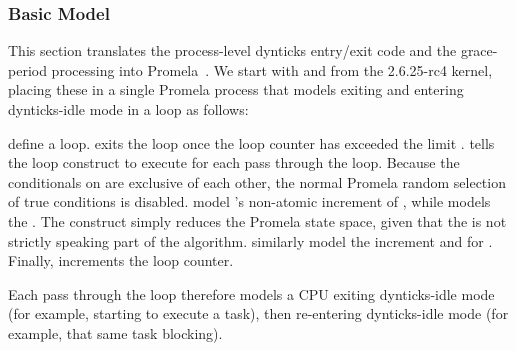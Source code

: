 \subsubsection{Basic Model}
\label{sec:formal:Basic Model}

This section translates the process-level dynticks entry/exit
code and the grace-period processing into
Promela~\cite{Holzmann03a}.
We start with  and
from the 2.6.25-rc4 kernel, placing these in a single Promela
process that models exiting and entering dynticks-idle mode in
a loop as follows:



\begin{fcvref}
 define a loop.
 exits the loop once the loop counter 
has exceeded the limit .
 tells the loop construct to execute
for each pass through the loop.
Because the conditionals on 
are exclusive of
each other, the normal Promela random selection of true conditions
is disabled.
 model
's non-atomic
increment of , while
 models the .
The  construct simply reduces the Promela state space,
given that the  is not strictly speaking part
of the algorithm.
 similarly model the increment and
 for .
Finally,  increments the loop counter.
\end{fcvref}

Each pass through the loop therefore models a CPU exiting
dynticks-idle mode (for example, starting to execute a task), then
re-entering dynticks-idle mode (for example, that same task blocking).


